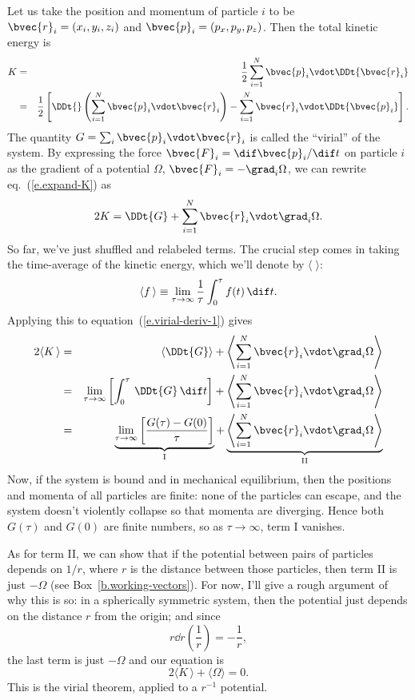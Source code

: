 Let us take the position and momentum of particle $i$ to be $\bvec{r}_{i} = (x_{i},y_{i},z_{i})$ and $\bvec{p}_{i}=(p_{x},p_{y},p_{z})$.  Then the total kinetic energy is
\begin{eqnarray}
\nonumber
	K &=& \frac{1}{2}\sum_{i=1}^{N}\bvec{p}_{i}\vdot\DDt{\bvec{r}_{i}}\\
		&=& \frac{1}{2}\left[\DDt{}\left(\sum_{i=1}^{N}\bvec{p}_{i}\vdot\bvec{r}_{i}\right) - \sum_{i=1}^{N}\bvec{r}_{i}\vdot\DDt{\bvec{p}_{i}}\right].
\label{e.expand-K}
\end{eqnarray}
The quantity $G = \sum_{i}\bvec{p}_{i}\vdot\bvec{r}_{i}$ is called the ``virial'' of the system.  By expressing the force $\bvec{F}_{i} = \dif\bvec{p}_{i}/\dif t$ on particle $i$ as the gradient of a potential $\Omega$, $\bvec{F}_{i} = -\grad_{i}\Omega$, we can rewrite eq.~(\ref{e.expand-K}) as
\begin{equation}\label{e.virial-deriv-1}
	2K = \DDt{G} + \sum_{i=1}^{N}\bvec{r}_{i}\vdot\grad_{i}\Omega.
\end{equation}
So far, we've just shuffled and relabeled terms.  The crucial step comes in taking the time-average of the kinetic energy, which we'll denote by $\langle\;\rangle$:
\[	\langle f\,\rangle \equiv \lim_{\tau\to\infty} \frac{1}{\tau}\int_{0}^{\tau}f(t)\,\dif t. \]
Applying this to equation~(\ref{e.virial-deriv-1}) gives
\begin{eqnarray*}
	2\langle K\,\rangle &=&
		 \left\langle\DDt{G}\right\rangle 
		+ \left\langle\sum_{i=1}^{N}\bvec{r}_{i}\vdot\grad_{i}\Omega\right\rangle\\
	&=& \lim_{\tau\to\infty}\left[\int_{0}^{\tau}\,\DDt{G}\,\dif t\right] 
		+ \left\langle\sum_{i=1}^{N}\bvec{r}_{i}\vdot\grad_{i}\Omega\right\rangle\\
	&=& \underbrace{\lim_{\tau\to\infty}\left[\frac{G(\tau)-G(0)}{\tau}\right]}_{\mathrm{I}}
		+ \underbrace{\left\langle\sum_{i=1}^{N}\bvec{r}_{i}\vdot\grad_{i}\Omega\right\rangle}_{\mathrm{II}}
\end{eqnarray*}
Now, if the system is bound and in mechanical equilibrium, then the positions and momenta of all particles are finite: none of the particles can escape, and the system doesn't violently collapse so that momenta are diverging.  Hence both $G(\tau)$ and $G(0)$ are finite numbers, so as $\tau\to\infty$, term I vanishes.

As for term II, we can show that if the potential between pairs of particles depends on $1/r$, where $r$ is the distance between those particles, then term II is just $-\Omega$ (see Box~\ref{b.working-vectors}).  For now, I'll give a rough argument of why this is so:  in a spherically symmetric system, then the potential just depends on the distance $r$ from the origin; and since
\[
	r\dd{}{r} \left(\frac{1}{r}\right) = -\frac{1}{r},
\]
the last term is just $-\Omega$ and our equation is
\begin{equation}\label{e.virial-theorem}
2\langle K\,\rangle + \langle \Omega\rangle = 0.
\end{equation}
This is the virial theorem, applied to a $r^{-1}$ potential.

